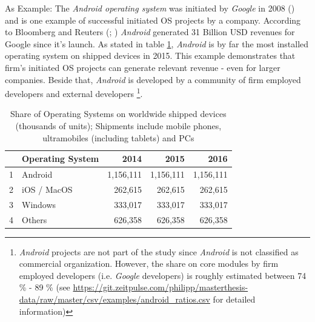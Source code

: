 As Example: The \textit{Android operating system} was initiated by \textit{Google} in 2008 (\cite{AnnouncingTheAndroid1SDK:online}) and is one example of successful initiated OS projects by a company. According to Bloomberg and Reuters (\cite{GooglesAndroidGenerates31BillionRevenue:online}; \cite{OracleLawyerSaysGooglesAndroidGenerated31BillionRevenue:online}) \textit{Android} generated 31 Billion USD revenues for Google since it's launch. As stated in table \ref{tbl:mobileos2014-2016}, \textit{Android} is by far the most installed operating system on shipped devices in 2015. This example demonstrates that firm's initiated OS projects can generate relevant revenue - even for larger companies. Beside that, \textit{Android} is developed by a community of firm employed developers and external developers \footnote{\textit{Android} projects are not part of the study since \textit{Android} is not classified as commercial organization. However, the share on core modules by firm employed developers (i.e. \textit{Google} developers) is roughly estimated between 74 \% - 89 \% (see \url{https://git.zeitpulse.com/philipp/masterthesis-data/raw/master/csv/examples/android_ratios.csv} for detailed information) }.

\begin{table}[ht]
\centering
\begin{tabular}{rlrrr}
  \hline
 & Operating System & 2014 & 2015 & 2016 \\
  \hline
1 & Android & 1,156,111 & 1,156,111 & 1,156,111 \\
  2 & iOS / MacOS & 262,615 & 262,615 & 262,615 \\
  3 & Windows & 333,017 & 333,017 & 333,017 \\
  4 & Others & 626,358 & 626,358 & 626,358 \\
   \hline
\end{tabular}
\caption[Share of Operating Systems on worldwide shipped devices]{Share of Operating Systems on worldwide shipped devices (thousands of units); Shipments include mobile phones, ultramobiles (including tablets) and PCs \protect\footnotemark}
\label{tbl:mobileos2014-2016}
\end{table}

